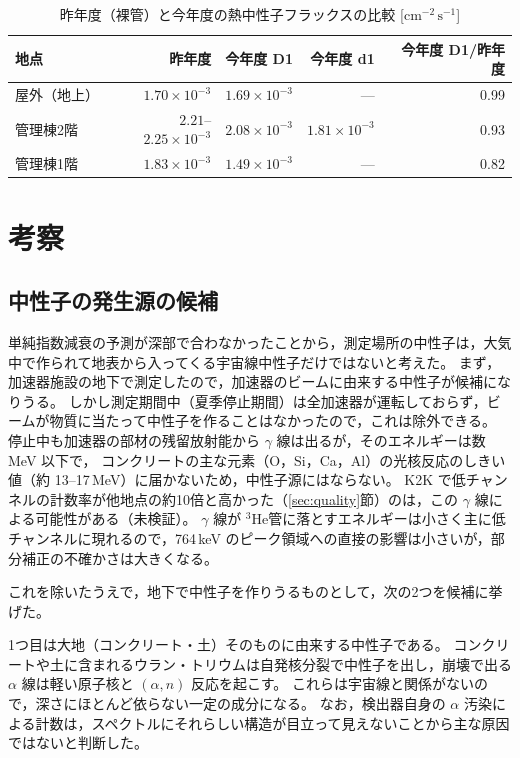 \documentclass[a4paper,11pt]{ltjsarticle}
\newcommand{\He}{\ensuremath{{}^{3}\mathrm{He}}}
\newcommand{\flux}{\mathrm{cm^{-2}\,s^{-1}}}
\begin{document}
\begin{table}[htbp]
  \centering
  \caption{昨年度（裸管）と今年度の熱中性子フラックスの比較 [$\flux$]}
  \label{tab:compare}
  \begin{tabular}{lrrrr}
    \toprule
    地点 & 昨年度 & 今年度 D1 & 今年度 d1 & 今年度 D1/昨年度 \\
    \midrule
    屋外（地上） & $1.70\times10^{-3}$ & $1.69\times10^{-3}$ & --- & 0.99 \\
    管理棟2階 & $2.21$--$2.25\times10^{-3}$ & $2.08\times10^{-3}$ & $1.81\times10^{-3}$ & 0.93 \\
    管理棟1階 & $1.83\times10^{-3}$ & $1.49\times10^{-3}$ & --- & 0.82 \\
    \bottomrule
  \end{tabular}
\end{table}

\section{考察}

\subsection{中性子の発生源の候補}
\label{sec:source}

単純指数減衰の予測が深部で合わなかったことから，測定場所の中性子は，大気中で作られて地表から入ってくる宇宙線中性子だけではないと考えた。
まず，加速器施設の地下で測定したので，加速器のビームに由来する中性子が候補になりうる。
しかし測定期間中（夏季停止期間）は全加速器が運転しておらず，ビームが物質に当たって中性子を作ることはなかったので，これは除外できる。
停止中も加速器の部材の残留放射能から $\gamma$ 線は出るが，そのエネルギーは数 MeV 以下で，
コンクリートの主な元素（O，Si，Ca，Al）の光核反応のしきい値（約 13--17\,MeV）に届かないため，中性子源にはならない。
K2K で低チャンネルの計数率が他地点の約10倍と高かった（\ref{sec:quality}節）のは，この $\gamma$ 線による可能性がある（未検証）。
$\gamma$ 線が \He 管に落とすエネルギーは小さく主に低チャンネルに現れるので，764\,keV のピーク領域への直接の影響は小さいが，部分補正の不確かさは大きくなる。

これを除いたうえで，地下で中性子を作りうるものとして，次の2つを候補に挙げた。

1つ目は大地（コンクリート・土）そのものに由来する中性子である。
コンクリートや土に含まれるウラン・トリウムは自発核分裂で中性子を出し，崩壊で出る $\alpha$ 線は軽い原子核と $(\alpha,n)$ 反応を起こす\cite{Wulandari2004}。
これらは宇宙線と関係がないので，深さにほとんど依らない一定の成分になる。
なお，検出器自身の $\alpha$ 汚染による計数は，スペクトルにそれらしい構造が目立って見えないことから主な原因ではないと判断した。
\end{document}
